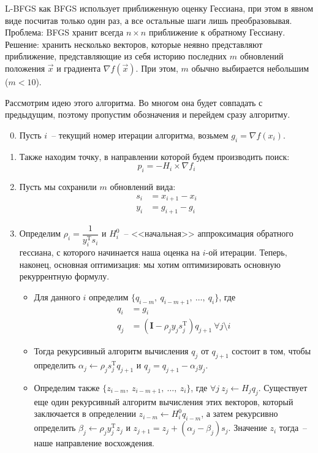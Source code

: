 \documentclass[12pt, a4paper, oneside, final]{article}
\begin{document}
	L-BFGS как BFGS использует приближенную оценку Гессиана, при этом в явном виде посчитав только один раз, а все остальные шаги лишь преобразовывая.
	Проблема: BFGS хранит всегда $n \times n$ приближение к обратному Гессиану.
	Решение: хранить несколько векторов, которые неявно представляют приближение, представляющие из себя историю последних $m$ обновлений положения $\vec{x}$ и градиента $\nabla{f(\vec{x})}$.
	При этом, $m$ обычно выбирается небольшим ($m < 10$).

	Рассмотрим идею этого алгоритма.
	Во многом она будет совпадать с предыдущим, поэтому пропустим обозначения и перейдем сразу алгоритму.
	\begin{enumerate}[1)]
		\setcounter{enumi}{-1}
		\item Пусть $i$~-- текущий номер итерации алгоритма, возьмем $g_{i} = \nabla{f(x_{i})}$.
		\item Также находим точку, в направлении которой будем производить поиск:
		\[
			p_{i} = -H_{i} \times \nabla{f_{i}}
		\]
		\item Пусть мы сохранили $m$ обновлений вида:
		\begin{align*}
			s_{i} &= x_{i + 1} - x_{i} \\
			y_{i} &= g_{i + 1} - g_{i}
		\end{align*}
		\item Определим $\rho_{i} = \dfrac{1}{y_{i}^{\mathrm{T}}s_{i}}$ и $H_{i}^{0}$~-- <<начальная>> аппроксимация обратного гессиана, с которого начинается наша оценка на $i$-ой итерации.
		Теперь, наконец, основная оптимизация: мы хотим оптимизировать основную рекуррентную формулу.
		\begin{itemize}
			\item Для данного $i$ определим $\{q_{i - m}, ~ q_{i - m + 1}, ~ \ldots, ~ q_{i}\}$, где
			\begin{align*}
				q_{i} &= g_{i} \\
				q_{j} &= \left(\mathbf{I} - \rho_{j}y_{j}s_{j}^{\mathrm{T}}\right)q_{j + 1} ~ \forall j \setminus i
			\end{align*}
			\item Тогда рекурсивный алгоритм вычисления $q_{j}$ от $q_{j + 1}$ состоит в том, чтобы определить $\alpha_{j} \gets \rho_{j}s_{j}^{\mathrm{T}}q_{j + 1}$ и $q_{j} = q_{j + 1} - \alpha_{j}y_{j}$.
			\item Определим также $\{z_{i - m}, ~ z_{i - m + 1}, ~ \ldots, ~ z_{i}\}$, где $\forall j ~ z_{j} \gets H_{j}q_{j}$.
			\subitem Существует еще один рекурсивный алгоритм вычисления этих векторов, который заключается в определении $z_{i - m} \gets H_{i}^{0}q_{i - m}$, а затем рекурсивно определить $\beta_{j} \gets \rho_{j}y_{j}^{\mathrm{T}}z_{j}$ и $z_{j + 1} = z_{j} + (\alpha_{j} - \beta_{j})s_{j}$. Значение $z_{i}$ тогда~-- наше направление восхождения.

\end{itemize}
\end{enumerate}
\end{document}

